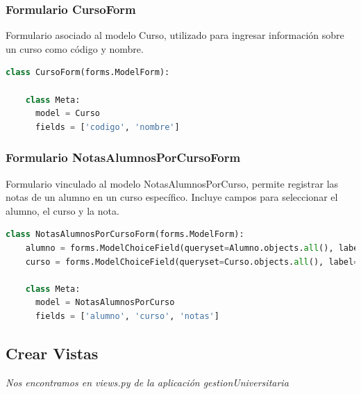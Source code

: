 \documentclass{article}
\begin{document}

  \subsubsection{Formulario CursoForm}
  Formulario asociado al modelo Curso, utilizado para ingresar información sobre un curso como código y nombre.
  \begin{lstlisting}[language=python, caption={Formulario CursoForm}]
  class CursoForm(forms.ModelForm):

    class Meta:
      model = Curso
      fields = ['codigo', 'nombre']
  \end{lstlisting}
  

  \subsubsection{Formulario NotasAlumnosPorCursoForm}
  Formulario vinculado al modelo NotasAlumnosPorCurso, permite registrar las notas de un alumno en un curso específico. 
  Incluye campos para seleccionar el alumno, el curso y la nota.
  \begin{lstlisting}[language=python, caption={Formulario NotasAlumnosPorCursoForm}]
  class NotasAlumnosPorCursoForm(forms.ModelForm):
    alumno = forms.ModelChoiceField(queryset=Alumno.objects.all(), label='Alumno')
    curso = forms.ModelChoiceField(queryset=Curso.objects.all(), label='Curso')
    
    class Meta:
      model = NotasAlumnosPorCurso
      fields = ['alumno', 'curso', 'notas']
  \end{lstlisting}
  \newpage
  

  \subsection{Crear Vistas}
  \textit{Nos encontramos en views.py de la aplicación gestionUniversitaria}
  
\end{document}

